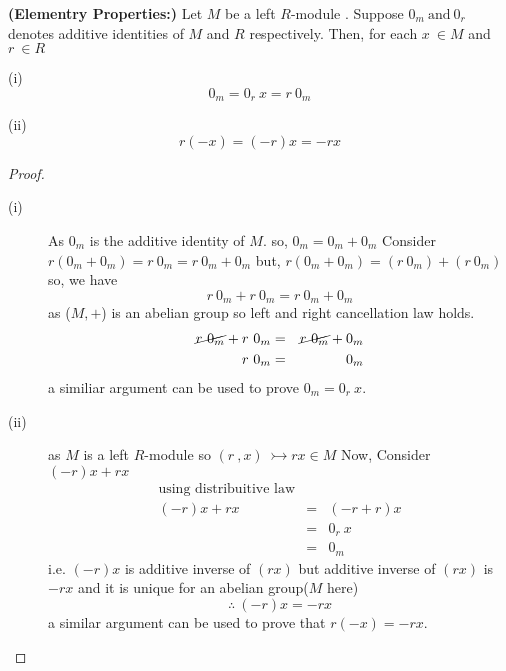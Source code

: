 \begin{thm}{\textbf{(Elementry Properties:)}}\newline
	Let $M$ be a left $R$-module . Suppose $0_m \ \text{and} \ 0_r$ denotes additive identities of $M$ and $R$ respectively. Then,  for each $x \ \in M$ and $r \ \in R$ \newline
\begin{description}
\item (i)
	\begin{equation*}
	0_m = 0_r\ x = r\ 0_m
	\end{equation*}
\item (ii)
	\begin{equation*}
	r(-x) =  (-r)x = -rx
	\end{equation*}
\end{description}
\end{thm}
\begin{proof}
	\begin{description}
		\item[(i)]
As $0_m$ is the additive identity of $M$. so, $0_m = 0_m + 0_m$\newline
Consider 
 $ r(0_m + 0_m) = r\ 0_m  = r\ 0_m +0_m $\newline
but, $r(0_m + 0_m) = (r\ 0_m) +(r\ 0_m)$ \newline
so, we have \begin{equation*}
r\ 0_m +r\ 0_m = r\ 0_m + 0_m
\end{equation*}
as ($M,+$) is an abelian group so left and right cancellation law holds.
\begin{eqnarray*}
\cancel{r\ 0_m} +r\ 0_m &=& \cancel{r\ 0_m} + 0_m \\ r\ 0_m &=& 0_m
\end{eqnarray*}
a similiar argument can be used to prove $0_m = 0_r\ x$.
\item[(ii)]
as $M$ is a left $R$-module so $(r \ , x )\ \rightarrowtail rx \in M$ \newline
Now, Consider $(-r)x + rx$
\begin{eqnarray*}
\text{using distribuitive law} \\ (-r)x + rx &=& (-r + r)x \\  &=& 0_r \ x \\ &=& 0_m
\end{eqnarray*}
i.e. $(-r)x$ is additive inverse of  $(rx)$ but additive inverse of $(rx)$ is $-rx$ and it is unique for an abelian group($M$ here)
\begin{equation*}
\therefore \ (-r)x = -rx
\end{equation*}
a similar argument can be used to prove that $r(-x)  = -r x$.
\end{description}
\end{proof}
